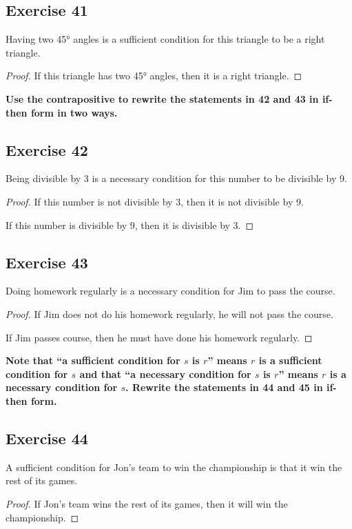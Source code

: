 \documentclass[14pt]{extarticle}
\begin{document}
\subsection{Exercise 41} Having two 45° angles is a sufficient condition for
this triangle to be a right triangle.

\begin{proof} If this triangle has two 45° angles, then it is a right triangle.
\end{proof}

{\bf Use the contrapositive to rewrite the statements in 42 and 43 in if-then
form in two ways.}

\subsection{Exercise 42} Being divisible by 3 is a necessary condition for this
number to be divisible by 9.

\begin{proof} If this number is not divisible by 3, then it is not divisible by
9.

If this number is divisible by 9, then it is divisible by 3. \end{proof}
\subsection{Exercise 43} Doing homework regularly is a necessary condition for
Jim to pass the course.

\begin{proof} If Jim does not do his homework regularly, he will not pass the
course.

If Jim passes course, then he must have done his homework regularly. \end{proof}
{\bf Note that “a sufficient condition for $s$ is $r$” means $r$ is a sufficient
condition for $s$ and that “a necessary condition for $s$ is $r$” means $r$ is a
necessary condition for $s$. Rewrite the statements in 44 and 45 in if-then
form.}

\subsection{Exercise 44} A sufficient condition for Jon’s team to win the
championship is that it win the rest of its games.

\begin{proof} If Jon’s team wins the rest of its games, then it will win the
championship. \end{proof}
\end{document}
